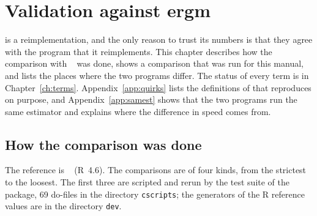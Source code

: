 \chapter{Validation against ergm}\label{ch:validation}

\nwergm{} is a reimplementation, and the only reason to trust its numbers is that they agree with the program that it reimplements. This chapter describes how the comparison with \ergm{}~\ergmver{} was done, shows a comparison that was run for this manual, and lists the places where the two programs differ. The status of every term is in Chapter~\ref{ch:terms}. Appendix~\ref{app:quirks} lists the definitions of \ergm{} that \nwergm{} reproduces on purpose, and Appendix~\ref{app:samest} shows that the two programs run the same estimator and explains where the difference in speed comes from.

\section{How the comparison was done}\label{sec:howvalidated}

The reference is \ergm{}~\ergmver{} (R~4.6). The comparisons are of four kinds, from the strictest to the loosest. The first three are scripted and rerun by the test suite of the package, 69 do-files in the directory \texttt{cscripts}; the generators of the R reference values are in the directory \texttt{dev}.

